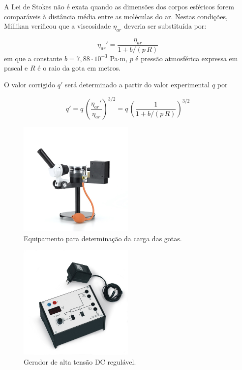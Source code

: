 \documentclass[a4paper,twoside,12pt]{article}      %
\begin{document}
A Lei de Stokes não é exata quando as dimensões dos corpos esféricos forem comparáveis à distância média entre as moléculas do ar. Nestas condições, Millikan verificou que a viscosidade $\eta_{ar}$ deveria ser substituída por:

\begin{equation}
    \label{eq:correcao}
    \eta_{ar}' = \frac{\eta_{ar}}{1 + b/(p\,R)}  
\end{equation}
em que a constante $b=7,88\cdot 10^{-3}$ Pa$\cdot$m, 
$p$ é pressão atmosférica expressa em pascal e $R$ é o raio da gota em metros.

O valor corrigido $q'$ será  determinado a partir do valor experimental $q$ por

\begin{equation}
    \label{eq:correcao1}
    q' = q\, \left(\frac{\eta_{ar}'}{\eta_{ar}}\right)^{3/2}  =q\, \left(\frac{1}{1 + b/(p\,R)}\right)^{3/2}  
\end{equation}

\begin{figure}
    [htb]  \centering 
    \includegraphics[width=0.5\textwidth]{./U131001_01_Aparelho-de-Millikan}
    \caption{Equipamento para determinação da carga das gotas. \label{fig:Equi}} 
\end{figure}

\begin{figure}
    [htb]  \centering 
    \includegraphics[width=0.5\textwidth]{./U13105-230_01_Aparelho-operacional-de-Millikan}
    \caption{Gerador de alta tensão DC regulável. \label{fig:fonteDC_HT}} 
\end{figure}
\end{document}
